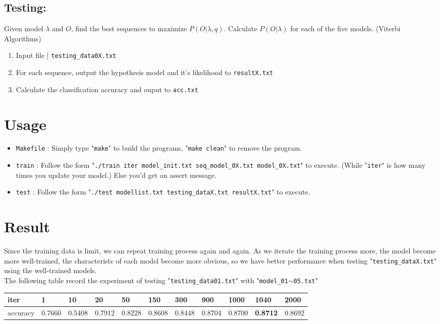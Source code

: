 \documentclass{article}
\newcommand\n{\mbox{\qquad}}
\begin{document}
\subsection{Testing:}
\n Given model $\lambda$ and $O$, find the best sequences to maximize $P(O|\lambda,q)$. Calculate $P(O|\lambda)$ for each of the five models. (Viterbi Algorithms)
\begin{enumerate}
	\item Input file | \texttt{testing\_data0X.txt}
	\item For each sequence, output the hypothesis model and it's likelihood to \texttt{resultX.txt}
	\item Calculate the classification accuracy and ouput to \texttt{acc.txt}
\end{enumerate}

\section{Usage}
\begin{itemize}
	\item \texttt{Makefile} : Simply type "\texttt{make}" to build the programs, "\texttt{make clean}" to remove the program.
	\item \texttt{train} : Follow the form "\texttt{./train iter model\_init.txt seq\_model\_0X.txt model\_0X.txt}" to execute. (While "\texttt{iter}" is how many times you update your model.) Else you'd get an assert message.
	\item \texttt{test} : Follow the form "\texttt{./test modellist.txt testing\_dataX.txt resultX.txt}" to execute.
\end{itemize}

\section{Result}
\n Since the training data is limit, we can repeat training process again and again. As we iterate the training process more, the model become more well-trained, the characteristc of each model become more obvious, so we have better performance when testing "\texttt{testing\_dataX.txt}" using the well-trained models. \\
The following table record the experiment of testing "\texttt{testing\_data01.txt}" with "\texttt{model\_01$\sim$05.txt}"
\begin{tabular}[t]{|l|l|l|l|l|l|l|l|l|l|l|}
\hline
iter & 1 & 10 & 20 & 50 & 150 & 300 & 900 & 1000 & \textbf{1040} & 2000\\
\hline 
accuracy & 0.7660 & 0.5408 & 0.7912 & 0.8228 & 0.8608 & 0.8448 & 0.8704 & 0.8700 & \textbf{0.8712} & 0.8692\\
\hline
\end{tabular}
\end{document}
